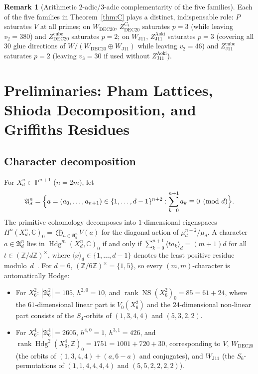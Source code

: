 \documentclass[11pt,a4paper]{amsart}
\theoremstyle{definition}
\newtheorem{remark}[theorem]{Remark}
\newcommand{\ZZ}{\mathbb{Z}}
\newcommand{\CC}{\mathbb{C}}
\newcommand{\PP}{\mathbb{P}}
\newcommand{\Hdg}{\operatorname{Hdg}}
\newcommand{\NS}{\operatorname{NS}}
\newcommand{\rank}{\operatorname{rank}}
\begin{document}
\begin{remark}[Arithmetic $2$-adic/$3$-adic complementarity of the five families]
Each of the five families in Theorem~\ref{thm:C} plays a distinct, indispensable role:
$P$ saturates $V$ at all primes; on $W_{\mathrm{DEC20}}$, $Z_{\mathrm{DEC20}}^{C_4}$ saturates $p = 3$ (while leaving $v_2 = 380$) and $Z_{\mathrm{DEC20}}^{\mathrm{cube}}$ saturates $p = 2$; on $W_{\mathrm{J11}}$, $Z_{\mathrm{J11}}^{\mathrm{Aoki}}$ saturates $p = 3$ (covering all $30$ glue directions of $W / (W_{\mathrm{DEC20}} \oplus W_{\mathrm{J11}})$ while leaving $v_2 = 46$) and $Z_{\mathrm{J11}}^{\mathrm{cube}}$ saturates $p = 2$ (leaving $v_3 = 30$ if used without $Z_{\mathrm{J11}}^{\mathrm{Aoki}}$).
\end{remark}

\section{Preliminaries: Pham Lattices, Shioda Decomposition, and Griffiths Residues}

\subsection{Character decomposition}
For $X_d^n \subset \PP^{n+1}$ ($n = 2m$), let
\[
  \mathfrak{A}_d^n = \Bigl\{ a = (a_0, \dots, a_{n+1}) \in \{1, \dots, d-1\}^{n+2} : \sum_{k=0}^{n+1} a_k \equiv 0 \pmod d \Bigr\}.
\]
The primitive cohomology decomposes into $1$-dimensional eigenspaces $H^n(X_d^n, \CC)_0 = \bigoplus_{a \in \mathfrak{A}_d^n} V(a)$ for the diagonal action of $\mu_d^{n+2}/\mu_d$.
A character $a \in \mathfrak{A}_d^n$ lies in $\Hdg^m(X_d^n, \CC)_0$ if and only if $\sum_{k=0}^{n+1} \langle t a_k \rangle_d = (m+1)d$ for all $t \in (\ZZ/d\ZZ)^\times$, where $\langle x \rangle_d \in \{1,\dots,d-1\}$ denotes the least positive residue modulo~$d$~\cite{Shi79}.
For $d = 6$, $(\ZZ/6\ZZ)^\times = \{1, 5\}$, so every $(m,m)$-character is automatically Hodge:
\begin{itemize}
  \item For $X_6^2$: $|\mathfrak{A}_6^2| = 105$, $h^{2,0} = 10$, and $\rank \NS(X_6^2)_0 = 85 = 61 + 24$, where the $61$-dimensional linear part is $V_0(X_6^2)$ and the $24$-dimensional non-linear part consists of the $S_4$-orbits of $(1,3,4,4)$ and $(5,3,2,2)$.
  \item For $X_6^4$: $|\mathfrak{A}_6^4| = 2605$, $h^{4,0} = 1$, $h^{3,1} = 426$, and $\rank \Hdg^2(X_6^4, \ZZ)_0 = 1751 = 1001 + 720 + 30$, corresponding to $V$, $W_{\mathrm{DEC20}}$ (the orbits of $(1,3,4,4)+(a,6-a)$ and conjugates), and $W_{\mathrm{J11}}$ (the $S_6$-permutations of $(1,1,4,4,4,4)$ and $(5,5,2,2,2,2)$).
\end{itemize}
\end{document}
